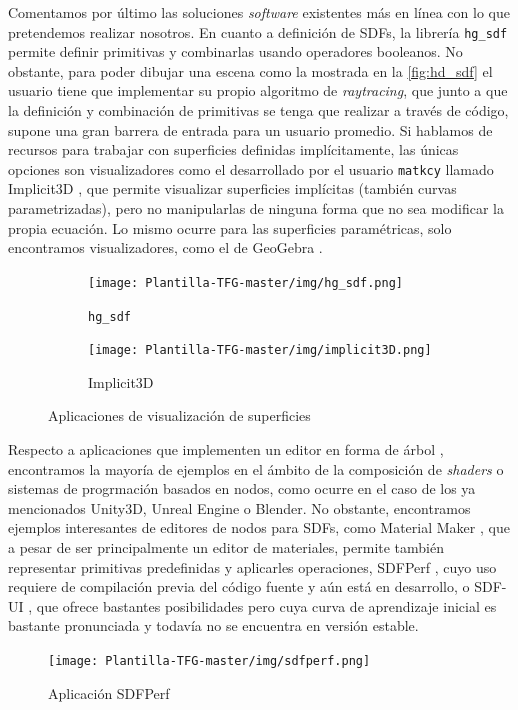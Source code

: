 Comentamos por último las soluciones \textit{software} existentes más en línea con lo que pretendemos realizar nosotros. En cuanto a definición de SDFs, la librería \texttt{hg\_sdf} \cite{hgsdf} permite definir primitivas y combinarlas usando operadores booleanos. No obstante, para poder dibujar una escena como la mostrada en la \autoref{fig:hd_sdf} el usuario tiene que implementar su propio algoritmo de \textit{raytracing}, que junto a que la definición y combinación de primitivas se tenga que realizar a través de código, supone una gran barrera de entrada para un usuario promedio. Si hablamos de recursos para trabajar con superficies definidas implícitamente, las únicas opciones son visualizadores como el desarrollado por el usuario \texttt{matkcy} llamado Implicit3D \cite{implicit3d}, que permite visualizar superficies implícitas (también curvas parametrizadas), pero no manipularlas de ninguna forma que no sea modificar la propia ecuación. Lo mismo ocurre para las superficies paramétricas, solo encontramos visualizadores, como el de GeoGebra \cite{geogebra_param}.\newline
\begin{figure}[!h]
    \centering
    \begin{subfigure}[b]{0.45\textwidth}
        \centering
        \texttt{[image: Plantilla-TFG-master/img/hg\_sdf.png]}
        \caption{\texttt{hg\_sdf}}
    \end{subfigure}
    \hspace{15pt}
    \begin{subfigure}[b]{0.45\textwidth}
        \centering
        \texttt{[image: Plantilla-TFG-master/img/implicit3D.png]}
        \caption{Implicit3D}
    \end{subfigure}
    \hfill
     \caption{Aplicaciones de visualización de superficies}
     \label{fig:hd_sdf}
\end{figure}

Respecto a aplicaciones que implementen un editor en forma de árbol \cite{prevwork}, encontramos la mayoría de ejemplos en el ámbito de la composición de \textit{shaders} o sistemas de progrmación basados en nodos, como ocurre en el caso de los ya mencionados Unity3D, Unreal Engine o Blender. No obstante, encontramos ejemplos interesantes de editores de nodos para SDFs, como Material Maker \cite{materialmaker}, que a pesar de ser principalmente un editor de materiales, permite también representar primitivas predefinidas y aplicarles operaciones, SDFPerf \cite{sdfperf}, cuyo uso requiere de compilación previa del código fuente y aún está en desarrollo, o SDF-UI \cite{sdfui}, que ofrece bastantes posibilidades pero cuya curva de aprendizaje inicial es bastante pronunciada y todavía no se encuentra en versión estable.
\begin{figure}[!h]
    \centering
        \texttt{[image: Plantilla-TFG-master/img/sdfperf.png]}
     \caption{Aplicación SDFPerf}
\end{figure}
